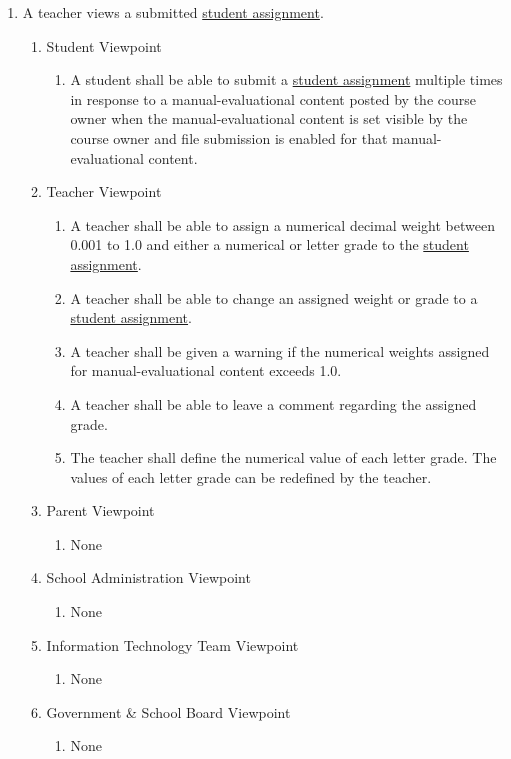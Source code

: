 \documentclass[]{article}
\begin{document}
\begin{enumerate}[{BE}1.]
	\item A teacher views a submitted \underline{student assignment}.
	\begin{enumerate}[{VP2}.1]
		\item Student Viewpoint
			\begin{enumerate}
				\item A student shall be able to submit a \underline{student assignment}
multiple times in response to a manual-evaluational content posted by the course
owner when the manual-evaluational content is set visible by the course
owner and file submission is enabled for that manual-evaluational content.
			\end{enumerate}
		\item Teacher Viewpoint
			\begin{enumerate}
				\item A teacher shall be able to assign a numerical decimal weight between
0.001 to 1.0 and either a numerical or letter grade to the \underline{student
assignment}.
				\item A teacher shall be able to change an assigned weight or grade to a
\underline{student assignment}.
				\item A teacher shall be given a warning if the numerical weights assigned 
for
manual-evaluational content exceeds 1.0.
				\item A teacher shall be able to leave a comment regarding the assigned
grade.
				\item The teacher shall define the numerical value of each letter grade. The
values of each letter grade can be redefined by the teacher.
			\end{enumerate}
		\item Parent Viewpoint
			\begin{enumerate}
				\item None
			\end{enumerate}
		\item School Administration Viewpoint
			\begin{enumerate}
				\item None
			\end{enumerate}
		\item Information Technology Team Viewpoint
			\begin{enumerate}
				\item None
			\end{enumerate}
		\item Government \& School Board Viewpoint
			\begin{enumerate}
				\item None
			\end{enumerate}
	\end{enumerate}


\end{enumerate}
\end{document}
